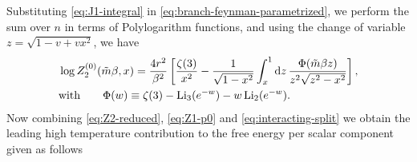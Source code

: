 \documentclass[a4paper,11pt]{article}
\newcommand{\e}{\mathrm e}
\newcommand{\dd}{\mathrm d}
\newcommand{\Li}{\operatorname{Li}}
\begin{document}
Substituting \eqref{eq:J1-integral} in
\eqref{eq:branch-feynman-parametrized}, we perform the sum over $n$ in terms of Polylogarithm functions,
and using the change of variable $z=\sqrt{1-v+vx^2}$, we have
\begin{align}
 &\log Z_2^{(0)}(\tilde m\beta,x)
 =\frac{4r^2}{\beta^2}\left[
 \frac{\zeta(3)}{x^2}
 -\frac{1}{\sqrt{1-x^2}}
 \int_x^1\dd z\,
 \frac{\Phi(\tilde m\beta z)}{z^2\sqrt{z^2-x^2}}
 \right],\nonumber\\
 \label{eq:Z2-reduced}
& {\rm with} \qquad \Phi(w)\equiv
 \zeta(3)-\Li_3(e^{-w})-w\Li_2(e^{-w}).
\end{align}
Now combining \eqref{eq:Z2-reduced}, \eqref{eq:Z1-p0} and \eqref{eq:interacting-split} we obtain the leading high temperature contribution to the free energy per scalar component given as follows
%
\end{document}
